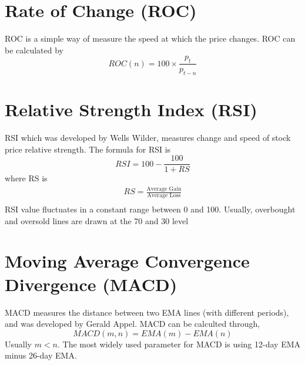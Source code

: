 \section{Rate of Change (ROC)}
ROC is a simple way of measure the speed at which the price changes\cite[p.~119]{leshik2011introduction}. ROC can be calculated by
\begin{equation}
	ROC(n) = 100\times\frac{p_t}{p_{t-n}}
\end{equation}


\section{Relative Strength Index (RSI)}
RSI which was developed by Wells Wilder, measures change and speed of stock price relative strength\cite[p.~119--120]{leshik2011introduction}. The formula for RSI is
\begin{equation}
RSI = 100 - \frac{100}{1 + RS}
\end{equation}
where RS is
\begin{gather*}
RS=\frac{\text{Average Gain}}{\text{Average Loss}}\\
\end{gather*}
RSI value fluctuates in a constant range between 0 and 100. Usually, overbought and oversold lines are drawn at the 70 and 30 level\cite[p.~120]{leshik2011introduction}

\section{Moving Average Convergence Divergence (MACD)}
MACD measures the distance between two EMA lines (with different periods), and was developed by Gerald Appel\cite[p.~279]{kahn2006technical}. MACD can be calculted through,
\begin{equation}
MACD(m,n)=EMA(m)-EMA(n)
\end{equation}
Usually $ m < n $. The most widely used parameter for MACD is using 12-day EMA minus 26-day EMA\cite[p.~279]{kahn2006technical}.